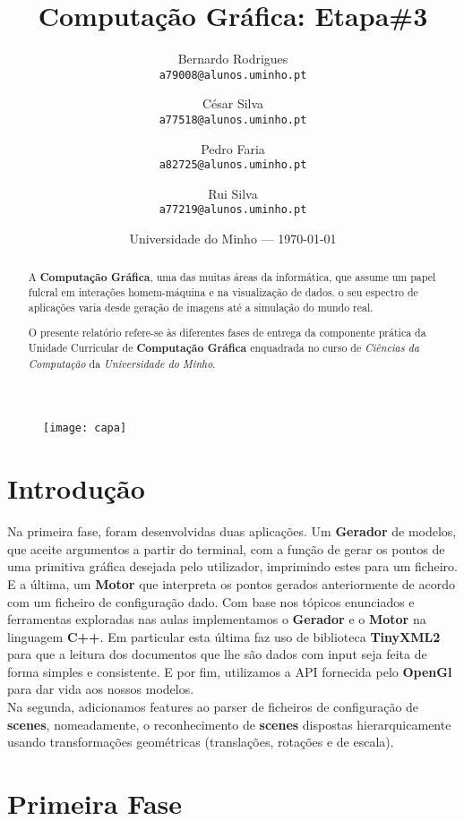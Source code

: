 \documentclass{article}
\title{Computação Gráfica: Etapa\#3} %
\author{Bernardo Rodrigues\\ \texttt{a79008@alunos.uminho.pt}\\ \and César Silva\\ \texttt{a77518@alunos.uminho.pt}\\ \and Pedro Faria\\ \texttt{a82725@alunos.uminho.pt} \and Rui Silva\\ \texttt{a77219@alunos.uminho.pt}\\} %
\date{Universidade do Minho --- \today} %
\begin{document}
\maketitle 
\begin{figure}[H]
	\centering
	\texttt{[image: capa]}
\end{figure}
\newpage

\begin{abstract}
A \textbf{Computação Gráfica}, uma das muitas áreas da informática, que assume um papel fulcral em interações homem-máquina e na visualização de dados. o seu espectro de aplicações varia desde geração de imagens até a simulação do mundo real. \par
	O presente relatório refere-se às diferentes fases de entrega da componente prática da Unidade Curricular de \textbf{Computação Gráfica} enquadrada no curso de \textit{Ciências da Computação} da \textit{Universidade do Minho}. 
\end{abstract}
\newpage


\tableofcontents{}
\newpage



\section{Introdução}
Na primeira fase, foram desenvolvidas duas aplicações. Um \textbf{Gerador} de modelos, que aceite argumentos a partir do terminal, com a função de gerar os pontos de uma primitiva gráfica desejada pelo utilizador, imprimindo estes para um ficheiro. E a última, um \textbf{Motor} que interpreta os pontos gerados anteriormente de acordo com um ficheiro de configuração dado. 
Com base nos tópicos enunciados e ferramentas exploradas nas aulas implementamos o \textbf{Gerador} e o \textbf{Motor} na linguagem \textbf{C++}. Em particular esta última faz uso de biblioteca \textbf{TinyXML2} para que a leitura dos documentos que lhe são dados com input seja feita de forma simples e consistente. E por fim,  utilizamos a API fornecida pelo \textbf{OpenGl} para dar vida aos nossos modelos.\\
Na segunda, adicionamos features ao parser de ficheiros de configuração de \textbf{scenes}, nomeadamente, o reconhecimento de \textbf{scenes} dispostas hierarquicamente usando transformações geométricas (translações, rotações e de escala).
\newpage

\section{Primeira Fase}
\end{document}
